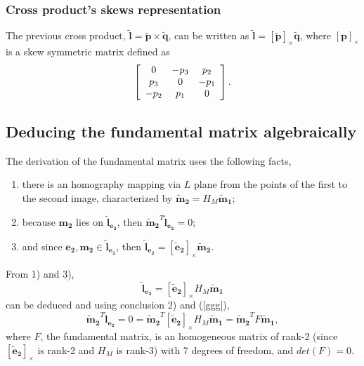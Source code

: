 \subsubsection{Cross product's \gls{skews} representation}
The previous cross product, $\mathbf{\tilde{l}} = \mathbf{\tilde{p}} \times \mathbf{\tilde{q}}$, can be written as $\mathbf{\tilde{l}} = [\mathbf{\tilde{p}}]_{\times} \mathbf{\tilde{q}}$, where $[\mathbf{p}]_{\times}$ is a skew symmetric matrix defined as
\begin{equation}
\left[ \begin{array} { c c c } { 0 } & { - p_ { 3 } } & { p_{ 2 } } \\ { p_{ 3 } } & { 0 } & { - p_{ 1 } } \\ { - p _ { 2 } } & { p_ { 1 } } & { 0 } \end{array} \right].
\end{equation}

\subsection{Deducing the fundamental matrix algebraically}

The derivation of the fundamental matrix uses the following facts,
\begin{enumerate}
	\item there is an \gls{homography} mapping via $L$ plane from the points of the first to the second image, characterized by $\mathbf{\tilde{m}_2} = H_M \mathbf{\tilde{m}_1}$;
	\item because $\mathbf{m_2}$ lies on $\mathbf{\tilde{l}_{e_2}}$, then $\mathbf{ \tilde{m}_2 } ^T \mathbf{\tilde{l}_{e_2}} = 0$;
	\item and since $\mathbf { e_2 }, \mathbf { m_2 } \in \mathbf{\tilde{l}_{e_2}}$, then $\mathbf{\tilde{l}_{e_2}} = [\mathbf{\tilde{e}_2}]_{\times} \mathbf{\tilde{m}_2}$.
\end{enumerate}
From 1) and 3), 
\begin{equation}
\label{ggg}
\mathbf{\tilde{l}_{e_2}} = [\mathbf{\tilde{e}_2}]_{\times} H_M \mathbf{\tilde{m}_1} 
\end{equation}
can be deduced and using conclusion 2) and (\ref{ggg}),
\begin{equation}
\label{sec2:eq:fundm}
\mathbf{\tilde{m}_2}^T \mathbf{\tilde{l}_{e_2}} = 0 = \mathbf{\tilde{m}_2}^T [\mathbf{\tilde{e}_2}]_{\times} H_M \mathbf{\tilde{m}_1}  = \mathbf{\tilde{m}_2}^T F \mathbf{\tilde{m}_1},
\end{equation}
where $F$, the fundamental matrix, is an homogeneous matrix of rank-2 (since $[\mathbf{\tilde{e}_2}]_{\times}$ is rank-2 and $H_M$ is rank-3) with 7 degrees of freedom, and $det(F) = 0$.

